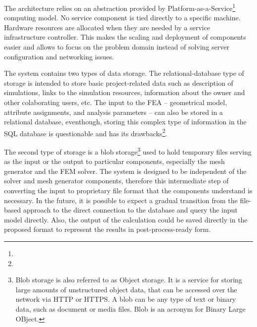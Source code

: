 The architecture relies on an abstraction provided by Platform-as-a-Service\footnote{} computing model. No service component is tied directly to a specific machine. Hardware resources are allocated when they are needed by a service infrastructure controller. This makes the scaling and deployment of components easier and allows to focus on the problem domain instead of solving server configuration and networking issues.

The system contains two types of data storage. The relational-database type of storage is intended to store basic project-related data such as description of simulations, links to the simulation resources, information about the owner and other colaborating users, etc. The input to the FEA -- geometrical model, attribute assignments, and analysis parameters -- can also be stored in a relational database, eventhough, storing this complex type of information in the SQL database is questionable and has its drawbacks\footnote{}.

The second type of storage is a blob storage\footnote{Blob storage is also referred to as Object storage. It is a service for storing large amounts of unstructured object data, that can be accessed over the network via HTTP or HTTPS. A blob can be any type of text or binary data, such as document or media files. Blob is an acronym for Binary Large OBject.} used to hold temporary files serving as the input or the output to particular components, especially the mesh generator and the FEM solver. The system is designed to be independent of the solver and mesh generator components, therefore this intermediate step of converting the input to proprietary file format that the components understand is necessary. In the future, it is possible to expect a gradual transition from the file-based approach to the direct connection to the database and query the input model directly. Also, the output of the calculation could be saved directly in the proposed format to represent the results in post-process-ready form.

